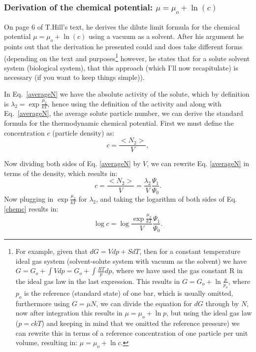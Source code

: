 \subsubsection{Derivation of the chemical potential: $\mu=\mu_o + \ln{(c)}$} 
On page 6 of T.Hill's text\cite{hill}, he derives the dilute limit formula for the chemical potential $\mu=\mu_o + \ln{(c)}$ using a vacuum as a solvent.  After his argument he points out that the derivation he presented could and does take different forms (depending on the text and purposes\footnote{For example, given that $dG=Vdp +SdT$, then for a constant temperature ideal gas system (solvent-solute system with vacuum as the solvent) we have $G = G_o +\int V dp = G_o + \int \frac{RT}{p}dp$, where we have used the gas constant R in the ideal gas law in the last expression.  This results in $G=G_o +\ln{\frac{p}{p_o}}$, where $p_o$ is the reference (standard state) of one bar, which is usually omitted, furthermore using $G=\mu N$, we can divide the equation for $dG$ through by $N$, now after integration this results in $\mu=\mu_o +\ln{p}$, but using the ideal gas law ($p=ckT$) and keeping in mind that we omitted the reference pressure) we can rewrite this in terms of a reference concentration of one particle per unit volume, resulting in: $\mu=\mu_o +\ln{c}$.} however, he states that for a solute solvent system (biological system), that this approach (which I'll now recapitulate) is necessary (if you want to keep things simple)).
 
In Eq.~\ref{averageN} we have the absolute activity of the solute, which by definition is $\lambda_{2}=\exp{\frac{\mu_{2}}{kT}}$, hence using the definition of the activity and along with Eq.~\ref{averageN}, the average solute particle number, we can derive the standard formula for the thermodynamic chemical potential.  First we must define the concentration $c$ (particle density) as:
\begin{equation}
 c = \frac{<N_2>}{V},
 \end{equation}

 Now dividing both sides of Eq. \ref{averageN} by $V$, we can rewrite Eq. 
\ref{averageN} in terms of the density, which results in:
\begin{equation}\label{chemc}
c =  \frac{< N_2 >}{V} =\frac{\lambda_{2}}{V} \frac{ \Psi_1}{\Psi_0}.
 \end{equation}
Now plugging in $\exp{\frac{\mu_{2}}{kT}}$ for $\lambda_{2}$, and taking the logarithm of both sides of Eq. \ref{chemc} results in:
\begin{equation}\label{chemc2}
\log{c} = \log{\frac{\exp{\frac{\mu_{2}}{kT}}}{V} \frac{ \Psi_1}{\Psi_0} }.
 \end{equation}
 
